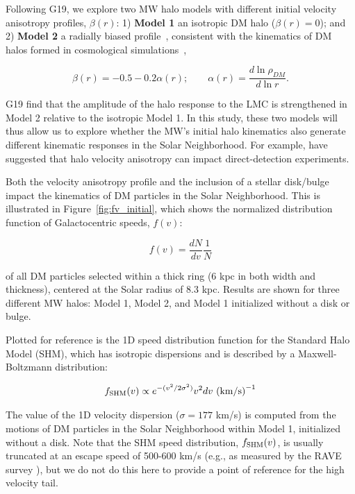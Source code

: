 \documentclass[letterpaper,11pt]{article}
\begin{document}
Following G19, 
we explore two MW halo models with different initial velocity 
anisotropy profiles,
$\beta(r)$: 1) \textbf{Model 1} an isotropic 
DM halo ($\beta(r)=0$); and 2) \textbf{Model 2} a radially
biased profile~\citep{Hansen:2006}, consistent with the kinematics of DM
halos formed in cosmological
simulations~\cite{Abadi:2006}, 

\begin{equation}
\beta(r)=-0.5-0.2\alpha(r) ; 
\qquad
\alpha(r)=\dfrac{d \ln \rho_{DM}}{d \ln r}.
\end{equation}

G19 find that the amplitude of the halo response to the LMC is strengthened in Model 2 relative to the isotropic Model 1.
In this study, these two models will thus
allow us to explore whether the MW's initial halo kinematics also
 generate different kinematic responses in the Solar Neighborhood. 
For example, \citet{Green:2002a,Green:2002b} have suggested that 
halo velocity anisotropy can impact direct-detection experiments.
 

Both the 
velocity anisotropy profile and the inclusion of a stellar disk/bulge
impact the kinematics of DM particles 
in the Solar Neighborhood.  This is illustrated in Figure~\ref{fig:fv_initial}, which 
shows the normalized distribution function of 
Galactocentric speeds, $f(v)$:  

\begin{equation}
    f(v) = \frac{dN}{dv}\frac{1}{N}
\end{equation}

\noindent of all DM particles
selected within a thick ring (6 kpc in both width and thickness),
centered at the Solar radius of 8.3 kpc. Results are shown for three different MW halos: Model 1, Model 2,
and Model 1 initialized without a disk or bulge. 

Plotted for reference is the 1D speed distribution 
function for the Standard Halo Model (SHM),
which has isotropic dispersions 
and is described by a Maxwell-Boltzmann distribution:

\begin{equation}
    f_{\rm SHM}(v) \propto e^{-(v^2/2\sigma^2)}v^2 dv \, \, \rm{ (km/s)}^{-1}
\end{equation}

The value of the 1D velocity dispersion ($\sigma = 177$ km/s) 
is computed from the 
motions of DM particles in the Solar Neighborhood
within Model 1, initialized without a disk. 
Note that the SHM speed distribution, $f_{\rm SHM}(v)$, is usually truncated 
at an escape speed of 500-600 km/s (e.g., as measured by the RAVE survey \cite{Piffl2014}), 
but we do not do this here to provide a point of reference for the high velocity tail. 
\end{document}
